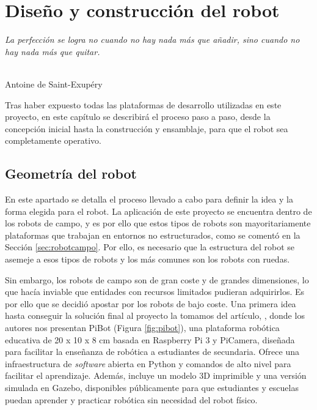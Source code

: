 \chapter{Diseño y construcción del robot}
\label{cap:capitulo5}

\begin{flushright}
\begin{minipage}[]{10cm}
\emph{La perfección se logra no cuando no hay nada más que añadir, sino cuando no hay nada más que quitar.}\\
\end{minipage}\\

Antoine de Saint-Exupéry\\
\end{flushright}

\vspace{1cm}

Tras haber expuesto todas las plataformas de desarrollo utilizadas en este proyecto, en este capítulo se describirá el proceso paso a paso, desde la concepción inicial hasta la construcción y ensamblaje, para que el robot sea completamente operativo.

\section{Geometría del robot}
\label{sec:geometriarobot}

En este apartado se detalla el proceso llevado a cabo para definir la idea y la forma elegida para el robot. La aplicación de este proyecto se encuentra dentro de los robots de campo, y es por ello que estos tipos de robots son mayoritariamente plataformas que trabajan en entornos no estructurados, como se comentó en la Sección \ref{sec:robotcampo}. Por ello, es necesario que la estructura del robot se asemeje a esos tipos de robots y los más comunes son los robots con ruedas. 

Sin embargo, los robots de campo son de gran coste y de grandes dimensiones, lo que hacía inviable que entidades con recursos limitados pudieran adquirirlos. Es por ello que se decidió apostar por los robots de bajo coste. Una primera idea hasta conseguir la solución final al proyecto la tomamos del artículo, \cite{vega18c}, donde los autores nos presentan PiBot (Figura \ref{fig:pibot}), una plataforma robótica educativa de 20 x 10 x 8 cm basada en Raspberry Pi 3 y PiCamera, diseñada para facilitar la enseñanza de robótica a estudiantes de secundaria. Ofrece una infraestructura de \textit{software} abierta en Python y comandos de alto nivel para facilitar el aprendizaje. Además, incluye un modelo 3D imprimible y una versión simulada en Gazebo, disponibles públicamente para que estudiantes y escuelas puedan aprender y practicar robótica sin necesidad del robot físico. 

